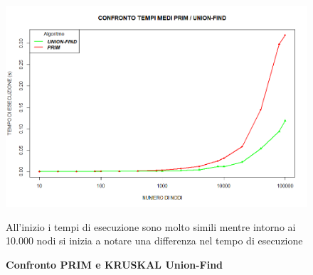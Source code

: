 \documentclass[]{article}
\begin{document}
\begin{flushleft}
\begin{figure}[h]
\includegraphics[width=\textwidth,height=\textheight,keepaspectratio]{COMPARE_1.png}
\caption{\textbf{Confronto PRIM e KRUSKAL Union-Find}}

All'inizio i tempi di esecuzione sono molto simili mentre intorno ai 10.000 nodi si inizia a notare una differenza nel tempo di esecuzione
\end{figure}

\end{flushleft}
\end{document}
